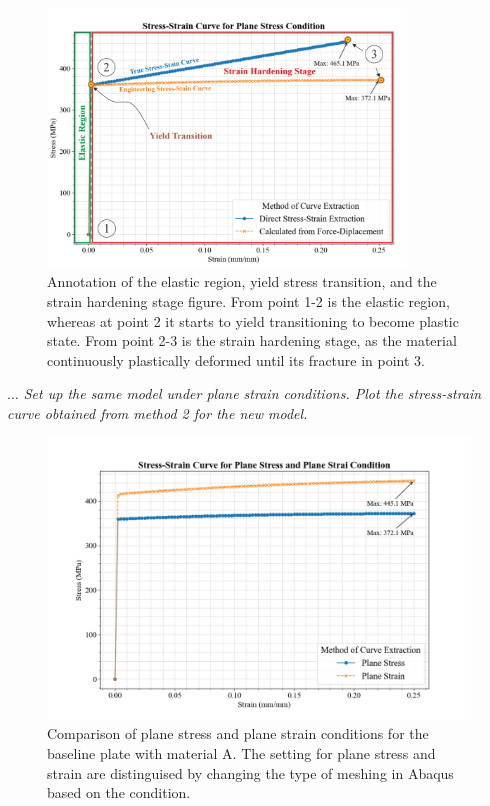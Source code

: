 \documentclass[12pt]{article}
\begin{document}
\begin{figure}[H]
    \centering
    \includegraphics[width=0.85\textwidth]{visualize_tensileGraph/res/comparison_direct_calculated_modified.png}
    \caption{Annotation of the elastic region, yield stress transition, and the strain hardening stage figure. From point 1-2 is the elastic region, whereas 
    at point 2 it starts to yield transitioning to become plastic state. From point 2-3 is the strain hardening stage, as the material continuously plastically
    deformed until its fracture in point 3.}
    \label{fig:distinguishImportantRegion}
\end{figure}


\vspace{1em}
\textit{$\dots$ Set up the same model under plane strain conditions. Plot the stress-strain curve obtained from
method 2 for the new model.}

\begin{figure}[H]
    \centering
    \includegraphics[width=1\textwidth]{visualize_tensileGraph/res/comparison_planeStress_planeStrain.png}
    \caption{Comparison of plane stress and plane strain conditions
    for the baseline plate with material A. The setting for plane stress and strain are distinguised by changing the type of meshing in
    Abaqus based on the condition.} 
    \label{fig:ComparisonDirectCalculated}  
\end{figure}
\end{document}
